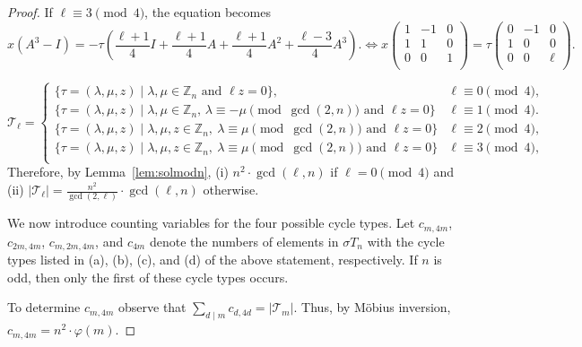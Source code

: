 \documentclass[12pt]{article}
\theoremstyle{definition}
\theoremstyle{remark}
\newcommand{\Z}{{\mathbb{Z}}}
\begin{document}
\begin{proof}
If $\ell \equiv 3 \pmod 4$, the equation becomes
\[
x(A^3-I) =- \tau \left(\frac{\ell+1}{4} I+ \frac{\ell+1}{4} A+\frac{\ell+1}{4} A^2+\frac{\ell-3}{4} A^3\right).
\Leftrightarrow
x\begin{pmatrix}
    1 & -1 & 0\\
1 & 1& 0\\
    0 &0 &1
    \\
\end{pmatrix}=\tau \begin{pmatrix}
    0 & -1 & 0\\
1 & 0& 0\\
    0 & 0 &  \ell
    \\
\end{pmatrix}.
\]



\[
\mathcal{T}_\ell = \begin{cases}  \{ \tau= (\lambda,\mu, z) \mid \lambda,\mu \in \Z_n  \textrm { and } \ell z = 0 \}, & \ell \equiv 0\pmod 4,\\
\{ \tau= (\lambda,\mu, z) \mid \lambda,\mu \in \Z_n,\,  \lambda\equiv -\mu\!\!\pmod{\gcd(2,n)} \textrm { and } \ell z = 0 \} & \ell \equiv 1\pmod 4.\\
 \{ \tau= (\lambda,\mu, z) \mid \lambda,\mu,z \in \Z_n,\ \lambda\equiv \mu\pmod{\gcd(2,n)}  \textrm { and } \ell z = 0 \} & \ell \equiv 2\pmod 4,\\
\{ \tau= (\lambda,\mu, z) \mid \lambda,\mu,z \in \Z_n,\ \lambda\equiv \mu\pmod{\gcd(2,n)}  \textrm { and } \ell z = 0 \} & \ell \equiv 3\pmod 4,\\
\end{cases}
\]
Therefore, by Lemma~\ref{lem:solmodn}, (i) $n^2 \cdot \gcd(\ell,n)$ if $\ell =0 \pmod 4$ and (ii) $\vert \mathcal{T}_\ell\vert =\frac{n^2}{\gcd(2,\ell)} \cdot \gcd(\ell,n)$ otherwise.



We now introduce counting variables for the four possible cycle types.
Let $c_{m,4m}$, $c_{2m,4m}$, $c_{m,2m,4m}$, and $c_{4m}$ denote the numbers of elements in $\sigma T_n$ with the cycle types listed in (a), (b), (c), and (d) of the above statement, respectively.
If $n$ is odd, then only the first of these cycle types occurs.

To determine
${c}_{m,4m}$ observe
that   $\sum_{d\mid m} c_{d,4d}= |\mathcal{T}_m\vert .$
Thus,  by M\"obius inversion, $c_{m,4m}= n^2\cdot \varphi(m).$


\end{proof}
\end{document}
